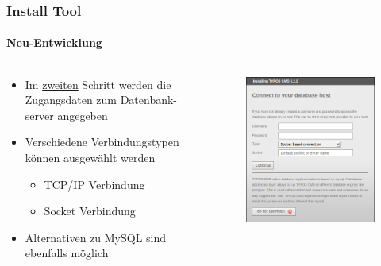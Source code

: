 
\begin{frame}[fragile]
	\frametitle{Install Tool}
	\framesubtitle{Neu-Entwicklung}

	\begin{columns}[T]

		\begin{column}{.5\textwidth}
			\begin{itemize}
				\item Im \underline{zweiten} Schritt werden die Zugangsdaten zum Datenbank-\newline
					server angegeben
				\item Verschiedene Verbindungstypen können ausgewählt werden
					\begin{itemize}
						\item TCP/IP Verbindung
						\item Socket Verbindung
					\end{itemize}
				\item Alternativen zu MySQL sind ebenfalls möglich
			\end{itemize}
		\end{column}

		\begin{column}{.5\textwidth}
			\begin{figure}\vspace*{-0.4cm}
				\includegraphics[width=0.8\linewidth]{Images/InstallTool/DatabaseConnectionDetails.png}
			\end{figure}
		\end{column}

	\end{columns}

\end{frame}

